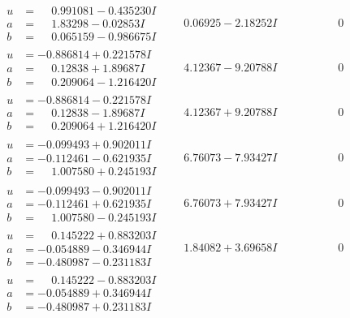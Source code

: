 \documentclass[1p]{elsarticle_modified}
\theoremstyle{definition}
\begin{document}
$$\begin{array}{c|c|c}
\begin{aligned}
u &= \phantom{-}0.991081 - 0.435230 I \\
a &= \phantom{-}1.83298 - 0.02853 I \\
b &= \phantom{-}0.065159 - 0.986675 I\end{aligned}
 & \phantom{-}0.06925 - 2.18252 I & \phantom{-0.000000 } 0 \\ \hline\begin{aligned}
u &= -0.886814 + 0.221578 I \\
a &= \phantom{-}0.12838 + 1.89687 I \\
b &= \phantom{-}0.209064 - 1.216420 I\end{aligned}
 & \phantom{-}4.12367 - 9.20788 I & \phantom{-0.000000 } 0 \\ \hline\begin{aligned}
u &= -0.886814 - 0.221578 I \\
a &= \phantom{-}0.12838 - 1.89687 I \\
b &= \phantom{-}0.209064 + 1.216420 I\end{aligned}
 & \phantom{-}4.12367 + 9.20788 I & \phantom{-0.000000 } 0 \\ \hline\begin{aligned}
u &= -0.099493 + 0.902011 I \\
a &= -0.112461 - 0.621935 I \\
b &= \phantom{-}1.007580 + 0.245193 I\end{aligned}
 & \phantom{-}6.76073 - 7.93427 I & \phantom{-0.000000 } 0 \\ \hline\begin{aligned}
u &= -0.099493 - 0.902011 I \\
a &= -0.112461 + 0.621935 I \\
b &= \phantom{-}1.007580 - 0.245193 I\end{aligned}
 & \phantom{-}6.76073 + 7.93427 I & \phantom{-0.000000 } 0 \\ \hline\begin{aligned}
u &= \phantom{-}0.145222 + 0.883203 I \\
a &= -0.054889 - 0.346944 I \\
b &= -0.480987 - 0.231183 I\end{aligned}
 & \phantom{-}1.84082 + 3.69658 I & \phantom{-0.000000 } 0 \\ \hline\begin{aligned}
u &= \phantom{-}0.145222 - 0.883203 I \\
a &= -0.054889 + 0.346944 I \\
b &= -0.480987 + 0.231183 I\end{aligned}

\end{array}$$
\end{document}

